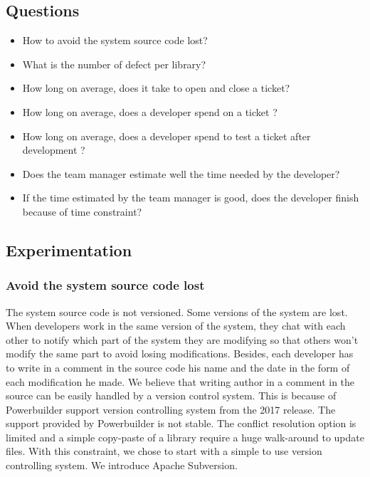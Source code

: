 \documentclass[10pt,conference]{IEEEtran}
\begin{document}
 \subsection{Questions}
 \begin{itemize}
 \item How to avoid the system source code lost?
 \item What is the number of defect per library?
 \item How long on average, does it take to open and close a ticket?
 \item How long on average,  does a developer spend on a ticket ?
 \item How long on average, does a developer spend to test a ticket after development ?
 \item Does the team manager estimate well  the time needed by the developer?
 \item If the time estimated by the team manager is good, does the developer finish because  of time constraint?
 \end{itemize}
 
 \subsection{Experimentation}

\subsubsection{Avoid the system source code lost}

The system source code is not versioned.  Some versions of the system are lost. 
When developers work in the same version of the system, they chat with each other to notify which part of the system they are modifying so that others won't modify the same part to avoid losing modifications. Besides, each developer has to write in a comment in the source code his name and the date in the form of each modification he made.  We believe that writing author in a comment in the source can be easily handled by a version control system.
This is because of Powerbuilder support version controlling system from the 2017 release. 
The support provided by Powerbuilder is not stable.
The conflict resolution option is limited and a simple copy-paste of a library require a huge walk-around to update files. 
With this constraint, we chose to start with a simple to use version controlling system. We introduce Apache Subversion. 
\end{document}
